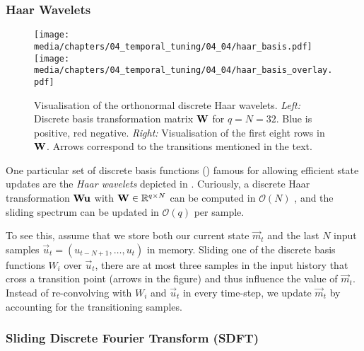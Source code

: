 \subsubsection{Haar Wavelets}

\begin{figure}
	\centering
	\texttt{[image: media/chapters/04\_temporal\_tuning/04\_04/haar\_basis.pdf]}%
	\kern-156.73mm\texttt{[image: media/chapters/04\_temporal\_tuning/04\_04/haar\_basis\_overlay.pdf]}%
	\caption[Visualisation of the orthonormal discrete Haar wavelets]{Visualisation of the orthonormal discrete Haar wavelets.
	\emph{Left:} Discrete basis transformation matrix $\mathbf{W}$ for $q = N = 32$. Blue is positive, red negative.
	\emph{Right:} Visualisation of the first eight rows in $\mathbf{W}$.
	Arrows correspond to the transitions mentioned in the text.
	}
	\label{fig:haar_basis}
\end{figure}

One particular set of discrete basis functions () famous for allowing efficient state updates are the \emph{Haar wavelets} depicted in  \citep{haar1910zur}.
Curiously, a discrete Haar transformation $\mathbf{W} \mathbf{u}$ with $\mathbf{W} \in \mathbb{R}^{q \times N}$ can be computed in $\mathcal{O}(N)$ \citep{kaiser1998fast}, and the sliding spectrum can be updated in $\mathcal{O}(q)$ per sample.

To see this, assume that we store both our current state $\vec m_t$ and the last $N$ input samples $\vec u_t = (u_{t - N + 1}, \ldots, u_{t})$ in memory.
Sliding one of the discrete basis functions $W_i$ over $\vec u_t$, there are at most three samples in the input history that cross a transition point (arrows in the figure) and thus influence the value of $\vec m_t$.
Instead of re-convolving with $W_i$ and $\vec u_t$ in every time-step, we update $\vec m_t$ by accounting for the transitioning samples.

\subsubsection{Sliding Discrete Fourier Transform (SDFT)}

